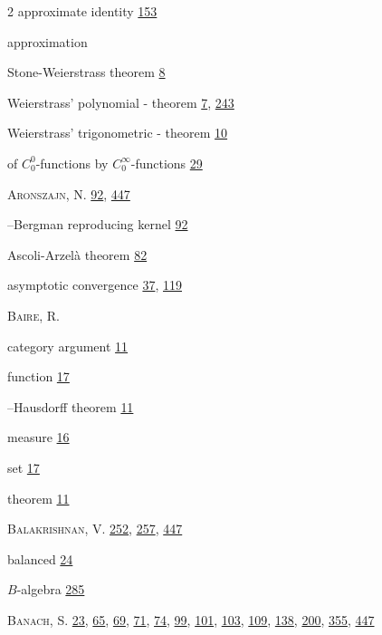 \begin{multicols}{2}
\noindent approximate identity \hyperlink{page.153}{153}\par
\noindent approximation\par
\hspace*{1.1em}Stone-Weierstrass theorem \hyperlink{page.8}{8}\par
\hspace*{1.1em}Weierstrass' polynomial - theorem \hyperlink{page.7}{7}, \hyperlink{page.243}{243}\par
\hspace*{1.1em}Weierstrass' trigonometric - theorem \hyperlink{page.10}{10}\par
\hspace*{1.1em}of $C_{0}^{0}$-functions by $C_{0}^{\infty}$-functions \hyperlink{page.29}{29}\par
\noindent \textsc{Aronszajn}, N. \hyperlink{page.92}{92}, \hyperlink{page.447}{447}\par
\hspace*{1.1em}--Bergman reproducing kernel \hyperlink{page.92}{92}\par
\noindent Ascoli-Arzelà theorem \hyperlink{page.82}{82}\par
\noindent asymptotic convergence \hyperlink{page.37}{37}, \hyperlink{page.119}{119}\par
\noindent \textsc{Baire}, R.\par
\hspace*{1.1em}category argument \hyperlink{page.11}{11}\par
\hspace*{1.1em}function \hyperlink{page.17}{17}\par
\hspace*{1.1em}--Hausdorff theorem \hyperlink{page.11}{11}\par
\hspace*{1.1em}measure \hyperlink{page.16}{16}\par
\hspace*{1.1em}set \hyperlink{page.17}{17}\par
\hspace*{1.1em}theorem \hyperlink{page.11}{11}\par
\noindent \textsc{Balakrishnan}, V. \hyperlink{page.252}{252}, \hyperlink{page.257}{257}, \hyperlink{page.447}{447}\par
\noindent balanced \hyperlink{page.24}{24}\par
\noindent $B$-algebra \hyperlink{page.285}{285}\par
\noindent \textsc{Banach}, S. \hyperlink{page.23}{23}, \hyperlink{page.65}{65}, \hyperlink{page.69}{69}, \hyperlink{page.71}{71}, \hyperlink{page.74}{74}, \hyperlink{page.99}{99}, \hyperlink{page.101}{101}, \hyperlink{page.103}{103}, \hyperlink{page.109}{109}, \hyperlink{page.138}{138}, \hyperlink{page.200}{200}, \hyperlink{page.355}{355}, \hyperlink{page.447}{447}\par

\end{multicols}
